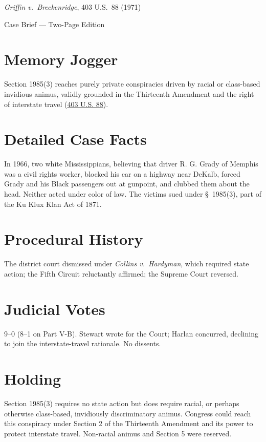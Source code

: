 \documentclass[12pt]{article}
\begin{document}
\begin{center}
{\LARGE \textit{Griffin v.\ Breckenridge}, 403 U.S.\ 88 (1971)\par}
\vspace{0.5em}
{\large Case Brief --- Two-Page Edition\par}
\end{center}

\section{Memory Jogger}
Section 1985(3) reaches purely private conspiracies driven by racial or class-based invidious animus, validly grounded in the Thirteenth Amendment and the right of interstate travel (\href{https://supreme.justia.com/cases/federal/us/403/88/}{403 U.S. 88}).

\section{Detailed Case Facts}
In 1966, two white Mississippians, believing that driver R. G. Grady of Memphis was a civil rights worker, blocked his car on a highway near DeKalb, forced Grady and his Black passengers out at gunpoint, and clubbed them about the head. Neither acted under color of law. The victims sued under \S~1985(3), part of the Ku Klux Klan Act of 1871.

\section{Procedural History}
The district court dismissed under \textit{Collins v.\ Hardyman}, which required state action; the Fifth Circuit reluctantly affirmed; the Supreme Court reversed.

\section{Judicial Votes}
9--0 (8--1 on Part V-B). Stewart wrote for the Court; Harlan concurred, declining to join the interstate-travel rationale. No dissents.

\section{Holding}
Section 1985(3) requires no state action but does require racial, or perhaps otherwise class-based, invidiously discriminatory animus. Congress could reach this conspiracy under Section 2 of the Thirteenth Amendment and its power to protect interstate travel. Non-racial animus and Section 5 were reserved.
\end{document}
